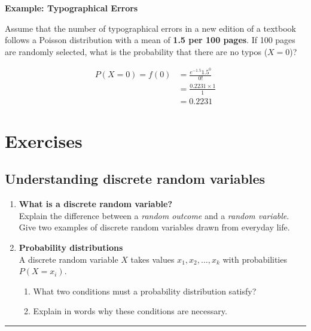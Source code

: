 \documentclass[
  letterpaper,
  DIV=11,
  numbers=noendperiod]{scrreprt}
\providecommand{\tightlist}{%
  \setlength{\itemsep}{0pt}\setlength{\parskip}{0pt}}
\begin{document}
\textbf{Example: Typographical Errors}

Assume that the number of typographical errors in a new edition of a
textbook follows a Poisson distribution with a mean of \textbf{1.5 per
100 pages}. If 100 pages are randomly selected, what is the probability
that there are no typos (\(X=0\))?

\[
\begin{aligned}
P(X=0) = f(0) &= \frac{e^{-1.5} 1.5^0}{0!} \\
              &= \frac{0.2231 \times 1}{1} \\
              &= \mathbf{0.2231}
\end{aligned}
\]

\section{Exercises}\label{exercises-4}

\subsection{Understanding discrete random
variables}\label{understanding-discrete-random-variables}

\begin{enumerate}
\def\labelenumi{\arabic{enumi}.}
\item
  \textbf{What is a discrete random variable?}\\
  Explain the difference between a \emph{random outcome} and a
  \emph{random variable}.\\
  Give two examples of discrete random variables drawn from everyday
  life.
\item
  \textbf{Probability distributions}\\
  A discrete random variable \(X\) takes values \(x_1, x_2, \dots, x_k\)
  with probabilities \(P(X=x_i)\).

  \begin{enumerate}
  \def\labelenumii{(\alph{enumii})}
  \tightlist
  \item
    What two conditions must a probability distribution satisfy?\\
  \item
    Explain in words why these conditions are necessary.
  \end{enumerate}
\end{enumerate}

\begin{center}\rule{0.5\linewidth}{0.5pt}\end{center}
\end{document}
